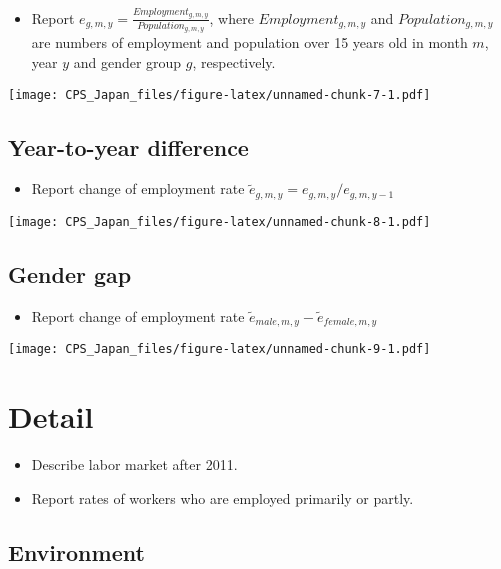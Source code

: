 \documentclass[
]{book}
\providecommand{\tightlist}{%
  \setlength{\itemsep}{0pt}\setlength{\parskip}{0pt}}
\begin{document}
\begin{itemize}
\tightlist
\item
  Report \(e_{g,m,y} = \frac{Employment_{g,m,y}}{Population_{g,m,y}}\), where \(Employment_{g,m,y}\) and \(Population_{g,m,y}\) are numbers of employment and population over 15 years old in month \(m\), year \(y\) and gender group \(g\), respectively.
\end{itemize}

\texttt{[image: CPS\_Japan\_files/figure-latex/unnamed-chunk-7-1.pdf]}

\hypertarget{year-to-year-difference-1}{%
\section{Year-to-year difference}\label{year-to-year-difference-1}}

\begin{itemize}
\tightlist
\item
  Report change of employment rate \(\tilde e_{g,m,y}=e_{g,m,y}/e_{g,m,y-1}\)
\end{itemize}

\texttt{[image: CPS\_Japan\_files/figure-latex/unnamed-chunk-8-1.pdf]}

\hypertarget{gender-gap-1}{%
\section{Gender gap}\label{gender-gap-1}}

\begin{itemize}
\tightlist
\item
  Report change of employment rate \(\tilde e_{male,m,y} - \tilde e_{female,m,y}\)
\end{itemize}

\texttt{[image: CPS\_Japan\_files/figure-latex/unnamed-chunk-9-1.pdf]}

\hypertarget{detail}{%
\chapter{Detail}\label{detail}}

\begin{itemize}
\item
  Describe labor market after 2011.
\item
  Report rates of workers who are employed primarily or partly.
\end{itemize}

\hypertarget{environment-2}{%
\section{Environment}\label{environment-2}}
\end{document}
